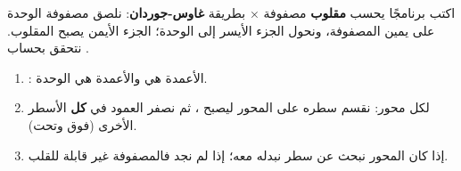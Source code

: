 \begin{statement}
اكتب برنامجًا يحسب \textbf{مقلوب} مصفوفة × بطريقة \textbf{غاوس-جوردان}: نلصق مصفوفة الوحدة على يمين المصفوفة، ونحول الجزء الأيسر إلى الوحدة؛ الجزء الأيمن يصبح المقلوب. نتحقق بحساب .
\end{statement}
\begin{stepsbox}\begin{enumerate}
\item {}: الأعمدة  هي  والأعمدة  هي الوحدة.
\item لكل محور: نقسم سطره على المحور ليصبح ، ثم نصفر العمود في \textbf{كل} الأسطر الأخرى (فوق وتحت).
\item إذا كان المحور  نبحث عن سطر نبدله معه؛ إذا لم نجد فالمصفوفة غير قابلة للقلب.
\end{enumerate}\end{stepsbox}
